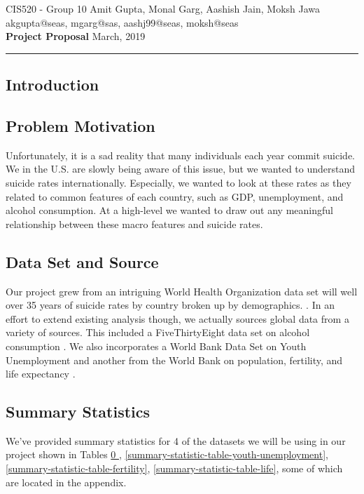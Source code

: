\documentclass{article}
\makeatletter
\newcommand{\MyName}{Amit Gupta, Monal Garg, Aashish Jain, Moksh Jawa}
\newcommand{\MyPennKey}{akgupta@seas, mgarg@sas, aashj99@seas, moksh@seas}
\newcommand{\Class}{CIS520}
\newcommand{\PrintFirstHeader}{
  \Large{\Class} - \large{Group 10} \hfill {\Large{\MyName}}
  \\
   \vspace{5pt} \hfill \normalsize{\MyPennKey}
  \\
  {\LARGE{\textbf{Project Proposal}}}  \hfill {\Large{March, 2019}}

  \rule{\textwidth}{0.4pt}}
\makeatother
\begin{document}
\thispagestyle{firstpage}
\PrintFirstHeader{}

\begin{multicols}{2}

\section{Introduction}
\subsection{Problem Motivation} Unfortunately, it is a sad reality that many individuals each year commit suicide. We in the U.S. are slowly being aware of this issue, but we wanted to understand suicide rates internationally. Especially, we wanted to look at these rates as they related to common features of each country, such as GDP, unemployment, and alcohol consumption. At a high-level we wanted to draw out any meaningful relationship between these macro features and suicide rates.
\subsection{Data Set and Source} Our project grew from an intriguing 
World Health Organization data set will well over 35 years of suicide rates by country broken up by demographics.  . In an effort to extend existing analysis though, we actually sources global data from a variety of sources. This included a FiveThirtyEight data set on alcohol consumption . We also incorporates a World Bank Data Set on Youth Unemployment  and another from the World Bank on population, fertility, and life expectancy .
\subsection{Summary Statistics} 
We've provided summary statistics for 4 of the datasets we will be using in our project shown in Tables \hyperref[summary-statistic-table-alcohol]{0
}, \ref{summary-statistic-table-youth-unemployment}, \ref{summary-statistic-table-fertility}, \ref{summary-statistic-table-life}, some of which are located in the appendix.


\end{multicols}
\end{document}
